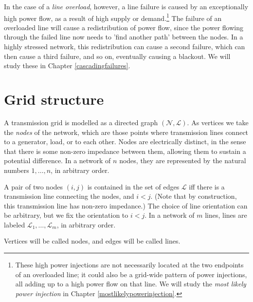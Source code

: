 \documentclass[main.tex]{subfiles}
\begin{document}
In the case of a \emph{line overload}, however, a line failure is caused by an exceptionally high power flow, as a result of high supply or demand.\footnote{These high power injections are not necessarily located at the two endpoints of an overloaded line; it could also be a grid-wide pattern of power injections, all adding up to a high power flow on that line. We will study the \emph{most likely power injection} in Chapter \ref{mostlikelypowerinjection}.}
The failure of an overloaded line will cause a redistribution of power flow, since the power flowing through the failed line now needs to 'find another path' between the nodes. In a highly stressed network, this redistribution can cause a second failure, which can then cause a third failure, and so on, eventually causing a blackout. We will study these  in Chapter \ref{cascadingfailures}. 

\section{Grid structure}
A transmission grid is modelled as a directed graph $(\mathcal{N},\mathcal{L})$. As vertices we take the \emph{nodes} of the network, which are those points where transmission lines connect to a generator, load, or to each other. Nodes are electrically distinct, in the sense that there is some non-zero impedance between them, allowing them to sustain a potential difference. In a network of $n$ nodes, they are represented by the natural numbers $1,\dots,n$, in arbitrary order.

A pair of two nodes $(i,j)$ is contained in the set of edges $\mathcal{L}$ iff there is a transmission line connecting the nodes, and $i<j$.  (Note that by construction, this transmission line has non-zero impedance.) The choice of line orientation can be arbitrary, but we fix the orientation to $i<j$. In a network of $m$ lines, lines are labeled $\mathcal{L}_1, \dots, \mathcal{L}_m$, in arbitrary order.

Vertices will be called nodes, and edges will be called lines.
\end{document}
